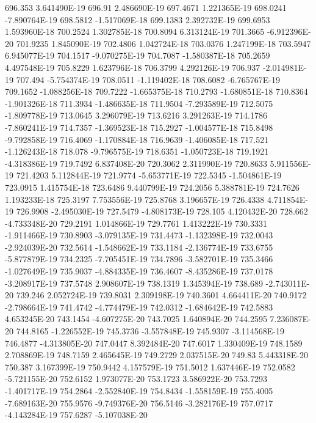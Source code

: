 696.353  3.641490E-19
696.91  2.486690E-19
697.4671  1.221365E-19
698.0241  -7.890764E-19
698.5812  -1.517069E-18
699.1383  2.392732E-19
699.6953  1.593960E-18
700.2524  1.302785E-18
700.8094  6.313124E-19
701.3665  -6.912396E-20
701.9235  1.845090E-19
702.4806  1.042724E-18
703.0376  1.247199E-18
703.5947  6.945077E-19
704.1517  -9.070275E-19
704.7087  -1.580387E-18
705.2659  4.497548E-19
705.8229  1.623796E-18
706.3799  4.292126E-19
706.937  -2.014981E-19
707.494  -5.754374E-19
708.0511  -1.119402E-18
708.6082  -6.765767E-19
709.1652  -1.088256E-18
709.7222  -1.665375E-18
710.2793  -1.680851E-18
710.8364  -1.901326E-18
711.3934  -1.486635E-18
711.9504  -7.293589E-19
712.5075  -1.809778E-19
713.0645  3.296079E-19
713.6216  3.291263E-19
714.1786  -7.860241E-19
714.7357  -1.369523E-18
715.2927  -1.004577E-18
715.8498  -9.792858E-19
716.4069  -1.170884E-18
716.9639  -1.406085E-18
717.521  -1.126243E-18
718.078  -9.796575E-19
718.6351  -1.050723E-18
719.1921  -4.318386E-19
719.7492  6.837408E-20
720.3062  2.311990E-19
720.8633  5.911556E-19
721.4203  5.112844E-19
721.9774  -5.653771E-19
722.5345  -1.504861E-19
723.0915  1.415754E-18
723.6486  9.440799E-19
724.2056  5.388781E-19
724.7626  1.193233E-18
725.3197  7.753556E-19
725.8768  3.196657E-19
726.4338  4.711854E-19
726.9908  -2.495030E-19
727.5479  -4.808173E-19
728.105  4.120432E-20
728.662  -4.733348E-20
729.2191  1.014866E-19
729.7761  1.413222E-19
730.3331  -1.911466E-19
730.8903  -3.079135E-19
731.4473  -1.132398E-19
732.0043  -2.924039E-20
732.5614  -1.548662E-19
733.1184  -2.136774E-19
733.6755  -5.877879E-19
734.2325  -7.705451E-19
734.7896  -3.582701E-19
735.3466  -1.027649E-19
735.9037  -4.884335E-19
736.4607  -8.435286E-19
737.0178  -3.208917E-19
737.5748  2.908607E-19
738.1319  1.345394E-19
738.689  -2.743011E-20
739.246  2.052724E-19
739.8031  2.309198E-19
740.3601  4.664411E-20
740.9172  -2.798664E-19
741.4742  -4.774479E-19
742.0312  -1.684642E-19
742.5883  4.653245E-20
743.1454  -4.607275E-20
743.7025  1.640894E-20
744.2595  7.236087E-20
744.8165  -1.226552E-19
745.3736  -3.557848E-19
745.9307  -3.114568E-19
746.4877  -4.313805E-20
747.0447  8.392484E-20
747.6017  1.330409E-19
748.1589  2.708869E-19
748.7159  2.465645E-19
749.2729  2.037515E-20
749.83  5.443318E-20
750.387  3.167399E-19
750.9442  4.157579E-19
751.5012  1.637446E-19
752.0582  -5.721155E-20
752.6152  1.973077E-20
753.1723  3.586922E-20
753.7293  -1.401717E-19
754.2864  -2.552840E-19
754.8434  -1.558159E-19
755.4005  -7.689163E-20
755.9576  -9.749376E-20
756.5146  -3.282176E-19
757.0717  -4.143284E-19
757.6287  -5.107038E-20
